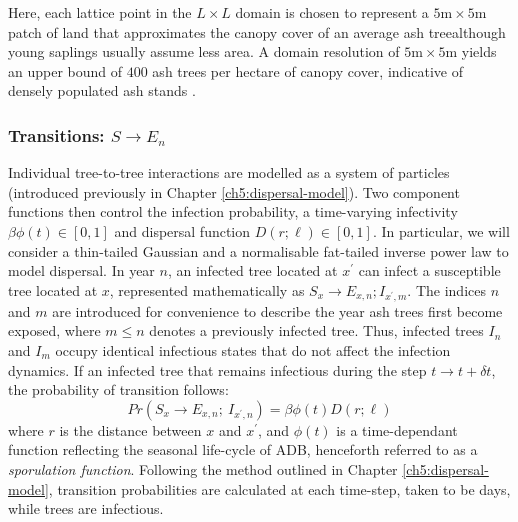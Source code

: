 Here, each lattice point in the $L\times L$ domain is chosen to represent a $5\mathrm{m}\times5\mathrm{m}$ patch of land
that approximates the canopy cover of an average ash tree\textemdash although young saplings usually assume less area. 
A domain resolution of $5\mathrm{m}\times5\mathrm{m}$ yields an upper bound of $400$ ash trees per hectare of canopy cover, 
indicative of densely populated ash stands \cite{ash-tree2, ash-tree1}.

\newpage 

\subsubsection{Transitions: $S\rightarrow E_n$}

Individual tree-to-tree interactions are modelled as a system of particles (introduced previously in Chapter \ref{ch5:dispersal-model}). Two component functions then control the infection probability, a time-varying infectivity $\beta\phi(t)\in [0, 1]$ and dispersal function $D(r; \ell)\in [0, 1]$. In particular, we will consider a thin-tailed Gaussian and a normalisable fat-tailed inverse power law to model dispersal.
In year $n$, an infected tree located at $x^\prime$ can infect a susceptible tree located at $x$, represented mathematically as $S_x \rightarrow E_{x,n}; I_{x^\prime, m}$. The indices $n$ and $m$ are introduced for convenience to describe the year ash trees first become exposed, where $m\leq n$ denotes a previously infected tree. Thus, infected trees $I_n$ and $I_{m}$ occupy identical infectious states that do not affect the infection dynamics. If an infected tree that remains infectious during the step $t\rightarrow t + \delta t$, the probability of transition follows:
\begin{equation}
    Pr(S_{x} \rightarrow E_{x,n} ;\ I_{x^{\prime}, n} ) = \beta  \phi(t) D(r;\ell)
\end{equation}
where $r$ is the distance between $x$ and $x^{\prime}$, and $\phi(t)$ is a time-dependant function reflecting the seasonal life-cycle of ADB, 
henceforth referred to as a \textit{sporulation function}. Following the method outlined in Chapter \ref{ch5:dispersal-model}, 
transition probabilities are calculated at each time-step, taken to be days, while trees are infectious.

